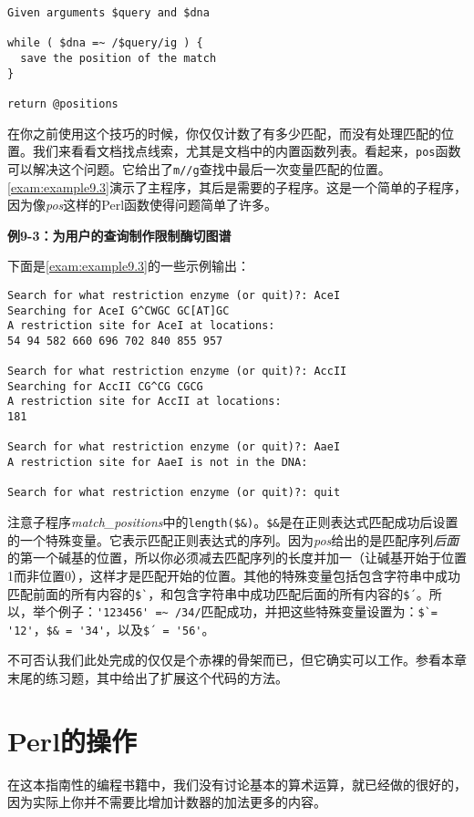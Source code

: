 \begin{lstlisting}
Given arguments $query and $dna

while ( $dna =~ /$query/ig ) {
  save the position of the match
}

return @positions
\end{lstlisting}

在你之前使用这个技巧的时候，你仅仅计数了有多少匹配，而没有处理匹配的位置。我们来看看文档找点线索，尤其是文档中的内置函数列表。看起来，\verb|pos|函数可以解决这个问题。它给出了\verb|m//g|查找中最后一次变量匹配的位置。\autoref{exam:example9.3}演示了主程序，其后是需要的子程序。这是一个简单的子程序，因为像\textit{pos}这样的Perl函数使得问题简单了许多。

\textbf{例9-3：为用户的查询制作限制酶切图谱}


下面是\autoref{exam:example9.3}的一些示例输出：

\begin{lstlisting}
Search for what restriction enzyme (or quit)?: AceI
Searching for AceI G^CWGC GC[AT]GC
A restriction site for AceI at locations:
54 94 582 660 696 702 840 855 957

Search for what restriction enzyme (or quit)?: AccII
Searching for AccII CG^CG CGCG
A restriction site for AccII at locations:
181

Search for what restriction enzyme (or quit)?: AaeI
A restriction site for AaeI is not in the DNA:

Search for what restriction enzyme (or quit)?: quit
\end{lstlisting}

注意子程序\textit{match\_positions}中的\verb|length($&)|。\verb|$&|是在正则表达式匹配成功后设置的一个特殊变量。它表示匹配正则表达式的序列。因为\textit{pos}给出的是匹配序列\textit{后面}的第一个碱基的位置，所以你必须减去匹配序列的长度并加一（让碱基开始于位置1而非位置0），这样才是匹配开始的位置。其他的特殊变量包括包含字符串中成功匹配前面的所有内容的\verb|$`|，和包含字符串中成功匹配后面的所有内容的\verb|$´|。所以，举个例子：\verb|'123456' =~ /34/|匹配成功，并把这些特殊变量设置为：\verb|$`= '12'|，\verb|$& = '34'|，以及\verb|$´ = '56'|。

不可否认我们此处完成的仅仅是个赤裸的骨架而已，但它确实可以工作。参看本章末尾的练习题，其中给出了扩展这个代码的方法。

\section{Perl的操作}
在这本指南性的编程书籍中，我们没有讨论基本的算术运算，就已经做的很好的，因为实际上你并不需要比增加计数器的加法更多的内容。

